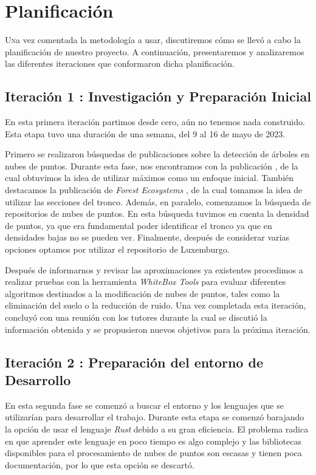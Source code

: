 \chapter{Planificación}
\label{chap:planification}

\lettrine{U}{n}a vez comentada la metodología a usar, discutiremos cómo se llevó a cabo la planificación de nuestro proyecto. A continuación, presentaremos y analizaremos las diferentes iteraciones que conformaron dicha planificación.

\section{Iteración 1 : Investigación y Preparación Inicial}
\label{chap:investigPlan}

En esta primera iteración partimos desde cero, aún no tenemos nada construido. Esta etapa tuvo una duración de una semana, del 9 al 16 de mayo de 2023.

Primero se realizaron búsquedas de publicaciones sobre la detección de árboles en nubes de puntos. Durante esta fase, nos encontramos con la publicación \cite{rs15061619}, de la cual obtuvimos la idea de utilizar máximos como un enfoque inicial. También destacamos la publicación de \textit{Forest Ecosystems} \cite{ZHANG2023100088}, de la cual tomamos la idea de utilizar las secciones del tronco. Además, en paralelo, comenzamos la búsqueda de repositorios de nubes de puntos. En esta búsqueda tuvimos en cuenta la densidad de puntos, ya que era fundamental poder identificar el tronco ya que en densidades bajas no se pueden ver. Finalmente, después de considerar varias opciones optamos por utilizar el repositorio de Luxemburgo.


Después de informarnos y revisar las aproximaciones ya existentes procedimos a realizar pruebas con la herramienta \textit{WhiteBox Tools} para evaluar diferentes algoritmos destinados a la modificación de nubes de puntos, tales como la eliminación del suelo o la reducción de ruido. Una vez completada esta iteración, concluyó con una reunión con los tutores durante la cual se discutió la información obtenida y se propusieron nuevos objetivos para la próxima iteración.

\section{Iteración 2 : Preparación del entorno de Desarrollo}
En esta segunda fase se comenzó a buscar el entorno y los lenguajes que se utilizarían para desarrollar el trabajo. Durante esta etapa se comenzó barajando la opción de usar el lenguaje \textit{Rust} debido a su gran eficiencia. El problema radica en que aprender este lenguaje en poco tiempo es algo complejo y las bibliotecas disponibles para el procesamiento de nubes de puntos son escasas y tienen poca documentación, por lo que esta opción se descartó.

